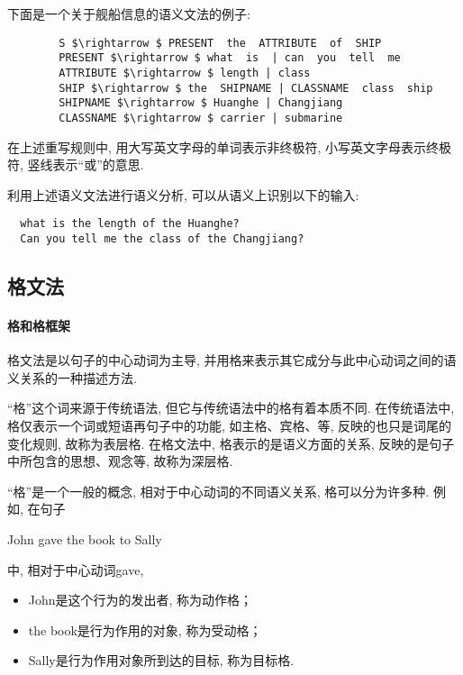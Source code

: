 \begin{example}
下面是一个关于舰船信息的语义文法的例子:
\begin{Verbatim}
        S $\rightarrow $ PRESENT  the  ATTRIBUTE  of  SHIP
        PRESENT $\rightarrow $ what  is  | can  you  tell  me
        ATTRIBUTE $\rightarrow $ length | class
        SHIP $\rightarrow $ the  SHIPNAME | CLASSNAME  class  ship
        SHIPNAME $\rightarrow $ Huanghe | Changjiang
        CLASSNAME $\rightarrow $ carrier | submarine
\end{Verbatim}
在上述重写规则中, 用大写英文字母的单词表示非终极符, 小写英文字母表示终极符, 竖线表示“或”的意思.
\end{example}

利用上述语义文法进行语义分析, 可以从语义上识别以下的输入:
\begin{Verbatim}
  what is the length of the Huanghe?
  Can you tell me the class of the Changjiang?
\end{Verbatim}
\subsection{格文法}

\paragraph{格和格框架}

    格文法是以句子的中心动词为主导, 并用格来表示其它成分与此中心动词之间的语义关系的一种描述方法.

“格”这个词来源于传统语法, 但它与传统语法中的格有着本质不同. 在传统语法中, 格仅表示一个词或短语再句子中的功能, 如主格、宾格、等, 反映的也只是词尾的变化规则, 故称为表层格. 在格文法中, 格表示的是语义方面的关系, 反映的是句子中所包含的思想、观念等, 故称为深层格.

“格”是一个一般的概念, 相对于中心动词的不同语义关系, 格可以分为许多种. 例如, 在句子
\begin{center}
  John gave the book to Sally
\end{center}
中, 相对于中心动词gave,

\begin{itemize}
\item John是这个行为的发出者, 称为动作格；
\item the book是行为作用的对象, 称为受动格；
\item Sally是行为作用对象所到达的目标, 称为目标格.
\end{itemize}

